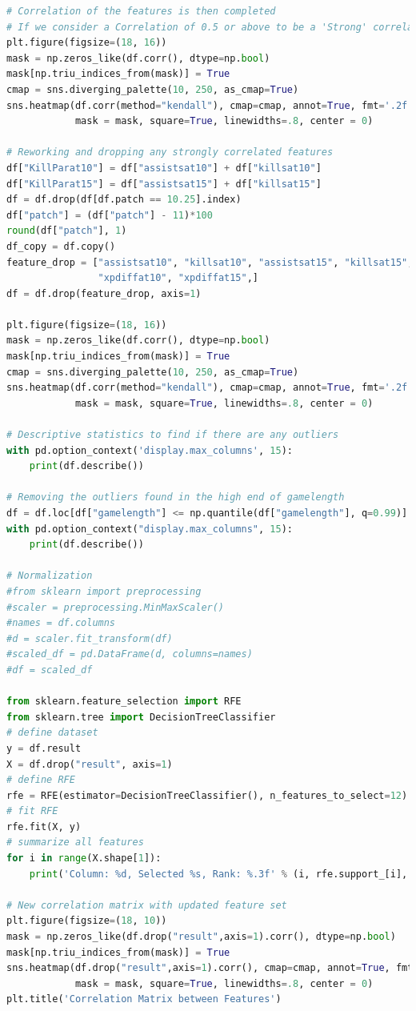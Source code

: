 \begin{lstlisting}[language=python,label={lst:pythoncode}]
# Correlation of the features is then completed
# If we consider a Correlation of 0.5 or above to be a 'Strong' correlation
plt.figure(figsize=(18, 16))
mask = np.zeros_like(df.corr(), dtype=np.bool)
mask[np.triu_indices_from(mask)] = True
cmap = sns.diverging_palette(10, 250, as_cmap=True)
sns.heatmap(df.corr(method="kendall"), cmap=cmap, annot=True, fmt='.2f', vmin=-1, vmax=1,
            mask = mask, square=True, linewidths=.8, center = 0)

# Reworking and dropping any strongly correlated features
df["KillParat10"] = df["assistsat10"] + df["killsat10"]
df["KillParat15"] = df["assistsat15"] + df["killsat15"]
df = df.drop(df[df.patch == 10.25].index)
df["patch"] = (df["patch"] - 11)*100
round(df["patch"], 1)
df_copy = df.copy()
feature_drop = ["assistsat10", "killsat10", "assistsat15", "killsat15", "golddiffat10", "golddiffat15",
                "xpdiffat10", "xpdiffat15",]
df = df.drop(feature_drop, axis=1)

plt.figure(figsize=(18, 16))
mask = np.zeros_like(df.corr(), dtype=np.bool)
mask[np.triu_indices_from(mask)] = True
cmap = sns.diverging_palette(10, 250, as_cmap=True)
sns.heatmap(df.corr(method="kendall"), cmap=cmap, annot=True, fmt='.2f', vmin=-1, vmax=1,
            mask = mask, square=True, linewidths=.8, center = 0)

# Descriptive statistics to find if there are any outliers
with pd.option_context('display.max_columns', 15):
    print(df.describe())

# Removing the outliers found in the high end of gamelength
df = df.loc[df["gamelength"] <= np.quantile(df["gamelength"], q=0.99)]
with pd.option_context("display.max_columns", 15):
    print(df.describe())

# Normalization
#from sklearn import preprocessing
#scaler = preprocessing.MinMaxScaler()
#names = df.columns
#d = scaler.fit_transform(df)
#scaled_df = pd.DataFrame(d, columns=names)
#df = scaled_df

from sklearn.feature_selection import RFE
from sklearn.tree import DecisionTreeClassifier
# define dataset
y = df.result
X = df.drop("result", axis=1)
# define RFE
rfe = RFE(estimator=DecisionTreeClassifier(), n_features_to_select=12)
# fit RFE
rfe.fit(X, y)
# summarize all features
for i in range(X.shape[1]):
    print('Column: %d, Selected %s, Rank: %.3f' % (i, rfe.support_[i], rfe.ranking_[i]))

# New correlation matrix with updated feature set
plt.figure(figsize=(18, 10))
mask = np.zeros_like(df.drop("result",axis=1).corr(), dtype=np.bool)
mask[np.triu_indices_from(mask)] = True
sns.heatmap(df.drop("result",axis=1).corr(), cmap=cmap, annot=True, fmt='.2f', vmin=-1, vmax=1,
            mask = mask, square=True, linewidths=.8, center = 0)
plt.title('Correlation Matrix between Features')


\end{lstlisting}
